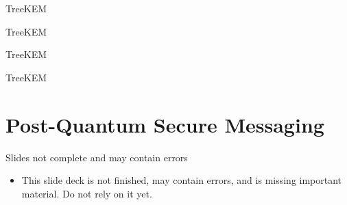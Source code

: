 \documentclass[aspectratio=169, lualatex, handout]{beamer}
\begin{document}
\begin{frame}{TreeKEM}
\end{frame}

\begin{frame}{TreeKEM}
\end{frame}

\begin{frame}{TreeKEM}
\end{frame}

\begin{frame}{TreeKEM}
\end{frame}


\section{Post-Quantum Secure Messaging}

\begin{frame}{Slides not complete and may contain errors}
	\begin{itemize}
		\item This slide deck is not finished, may contain errors, and is missing important material. Do not rely on it yet.
	\end{itemize}
\end{frame}

\begin{frame}[plain]
	\titlepage
\end{frame}
\end{document}
